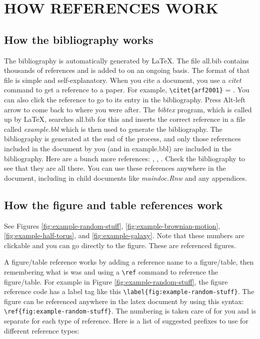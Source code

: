 \documentclass[11pt]{book}\usepackage[]{graphicx}\usepackage[]{color}
\newcommand{\rnwmaindocfile}{maindoc.Rnw}
\newcommand{\latex}{\LaTeX\xspace}
\begin{document}
\bigskip

\section{HOW REFERENCES WORK} \label{sec:how.refs.work}
\subsection{How the bibliography works} \label{subsec:how.bib.works}
The bibliography is automatically generated by \latex. The file all.bib contains thousands of references and is added to on an ongoing basis. The format of that file is simple and self-explanatory. When you cite a document, you use a \emph{citet} command to get a reference to a paper. For example, \verb!\citet{arf2001}! = \citet{arf2001}. You can also click the reference to go to its entry in the bibliography. Press Alt-left arrow to come back to where you were after. The \emph{bibtex} program, which is called up by \latex, searches all.bib for this and inserts the correct reference in a file called \emph{example.bbl} which is then used to generate the bibliography. The bibliography is generated at the end of the process, and only those references included in the document by you (and in example.bbl) are included in the bibliography. Here are a bunch more references: \citet{fournier1982}, \citet{sr95schnute,richards1997visualizing}, \citet{mcallister1997,gavaris2002}. Check the bibliography to see that they are all there. You can use these references anywhere in the document, including in child documents like \emph{\rnwmaindocfile} and any appendices.\\

\subsection{How the figure and table references work} \label{subsec:how.figure.refs.work}

See Figures \ref{fig:example-random-stuff}, \ref{fig:example-brownian-motion}, \ref{fig:example-half-torus}, and \ref{fig:example-galaxy}. Note that these numbers are clickable and you can go directly to the figure. These are referenced figures.

A figure/table reference works by adding a reference name to a figure/table, then remembering what is was and using a \verb!\ref! command to reference the figure/table. For example in Figure \ref{fig:example-random-stuff}, the figure reference code has a label tag like this \verb!\label{fig:example-random-stuff}!. The figure can be referenced anywhere in the latex document by using this syntax: \verb!\ref{fig:example-random-stuff}!. The numbering is taken care of for you and is separate for each type of reference. Here is a list of suggested prefixes to use for different reference types:
\end{document}
